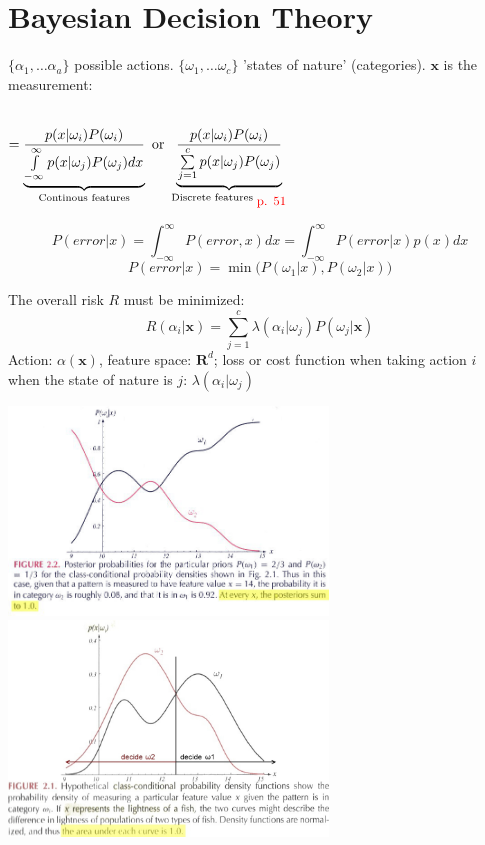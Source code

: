 \section{Bayesian Decision Theory}
\begin{minipage}{9.5cm}
  $\{\alpha_1, \ldots \alpha_a\}$ possible actions.
  $\{\omega_1, \ldots \omega_c\}$ 'states of nature' (categories).
  $\mathbf{x}$ is the measurement:
  \begin{center}
     \\
    $= \underbrace{\frac{p(x|\omega_i) P(\omega_i)}{\int\limits_{-\infty}^{\infty}p(x|\omega_j) P(\omega_j) dx}}_{\text{Continous features}}
     \text{ or } 
     \underbrace{\frac{p(x|\omega_i) P(\omega_i)}{\sum\limits_{j=1}^{c}p(x|\omega_j) P(\omega_j)}}_{\text{Discrete features $_{\textcolor{red}{\mbox{\small{p. 51}}}}$}}$
  \end{center}
  
  $$P(error|x) = \int_{-\infty}^{\infty} P(error, x) dx = \int_{-\infty}^{\infty} P(error|x) p(x) dx$$
  $$P(error|x) = \min\Big(P(\omega_1|x), P(\omega_2|x)\Big)$$
  
  
The overall risk $R$ must be minimized:
$$R(\alpha_i|\mathbf{x}) = \sum\limits_{j=1}^c \lambda(\alpha_i|\omega_j) P(\omega_j|\mathbf{x})$$
Action: $\alpha(\bm x)$, feature space: $\mathbf{R}^d$; loss or cost function when taking action $i$ 
when the state of nature is $j$: $\lambda(\alpha_i|\omega_j)$
  
\end{minipage} \vspace{1cm}
\begin{minipage}{9cm}
  \includegraphics[width=8.5cm]{./images/posterior-prob.jpg}\\
  \includegraphics[width=8.5cm]{./images/class-cond-prob.jpg}
\end{minipage}


